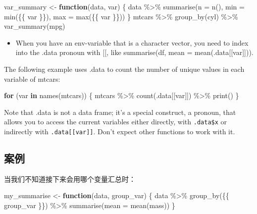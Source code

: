 \documentclass[
]{book}
\newenvironment{Shaded}{\begin{snugshade}}{\end{snugshade}}
\newcommand{\AttributeTok}[1]{\textcolor[rgb]{0.77,0.63,0.00}{#1}}
\newcommand{\ControlFlowTok}[1]{\textcolor[rgb]{0.13,0.29,0.53}{\textbf{#1}}}
\newcommand{\FunctionTok}[1]{\textcolor[rgb]{0.00,0.00,0.00}{#1}}
\newcommand{\NormalTok}[1]{#1}
\newcommand{\OtherTok}[1]{\textcolor[rgb]{0.56,0.35,0.01}{#1}}
\newcommand{\SpecialCharTok}[1]{\textcolor[rgb]{0.00,0.00,0.00}{#1}}
\providecommand{\tightlist}{%
  \setlength{\itemsep}{0pt}\setlength{\parskip}{0pt}}
\begin{document}
\begin{Shaded}
\begin{Highlighting}[]
\NormalTok{var\_summary }\OtherTok{\textless{}{-}} \ControlFlowTok{function}\NormalTok{(data, var) \{}
\NormalTok{  data }\SpecialCharTok{\%\textgreater{}\%}
    \FunctionTok{summarise}\NormalTok{(}\AttributeTok{n =} \FunctionTok{n}\NormalTok{(), }\AttributeTok{min =} \FunctionTok{min}\NormalTok{(\{\{ var \}\}), }\AttributeTok{max =} \FunctionTok{max}\NormalTok{(\{\{ var \}\}))}
\NormalTok{\}}
\NormalTok{mtcars }\SpecialCharTok{\%\textgreater{}\%} 
  \FunctionTok{group\_by}\NormalTok{(cyl) }\SpecialCharTok{\%\textgreater{}\%} 
  \FunctionTok{var\_summary}\NormalTok{(mpg)}
\end{Highlighting}
\end{Shaded}

\begin{itemize}
\tightlist
\item
  When you have an env-variable that is a character vector, you need to index into the .data pronoun with {[}{[}, like summarise(df, mean = mean(.data{[}{[}var{]}{]})).
\end{itemize}

The following example uses .data to count the number of unique values in each variable of mtcars:

\begin{Shaded}
\begin{Highlighting}[]
\ControlFlowTok{for}\NormalTok{ (var }\ControlFlowTok{in} \FunctionTok{names}\NormalTok{(mtcars)) \{}
\NormalTok{  mtcars }\SpecialCharTok{\%\textgreater{}\%} \FunctionTok{count}\NormalTok{(.data[[var]]) }\SpecialCharTok{\%\textgreater{}\%} \FunctionTok{print}\NormalTok{()}
\NormalTok{\}}
\end{Highlighting}
\end{Shaded}

Note that .data is not a data frame; it's a special construct, a pronoun, that allows you to access the current variables either directly, with \texttt{.data\$x} or indirectly with \texttt{.data{[}{[}var{]}{]}}. Don't expect other functions to work with it.

\hypertarget{ux6848ux4f8b}{%
\subsection{案例}\label{ux6848ux4f8b}}

当我们不知道接下来会用哪个变量汇总时：

\begin{Shaded}
\begin{Highlighting}[]
\NormalTok{my\_summarise }\OtherTok{\textless{}{-}} \ControlFlowTok{function}\NormalTok{(data, group\_var) \{}
\NormalTok{  data }\SpecialCharTok{\%\textgreater{}\%}
    \FunctionTok{group\_by}\NormalTok{(\{\{ group\_var \}\}) }\SpecialCharTok{\%\textgreater{}\%}
    \FunctionTok{summarise}\NormalTok{(}\AttributeTok{mean =} \FunctionTok{mean}\NormalTok{(mass))}
\NormalTok{\}}
\end{Highlighting}
\end{Shaded}
\end{document}
